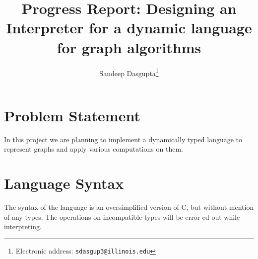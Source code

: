 \documentclass[12,twoside]{article}
\title{\textbf{Progress Report: Designing an Interpreter for a dynamic language 
  for graph algorithms}}
\author{Sandeep Dasgupta\thanks{Electronic address:
\texttt{sdasgup3@illinois.edu}}}
\begin{document}
\begin{titlepage}
\thispagestyle{empty}
\maketitle
\pagebreak
\end{titlepage}

\section{Problem Statement}

   In this project we are planning to implement a dynamically typed language to 
   represent graphs and apply various computations on them.
 
\section{Language Syntax}
  The syntax of the language is an oversimplified version  of C, but
    without mention of any types. The operations on incompatible types
    will be error-ed out while interpreting.
\end{document}
